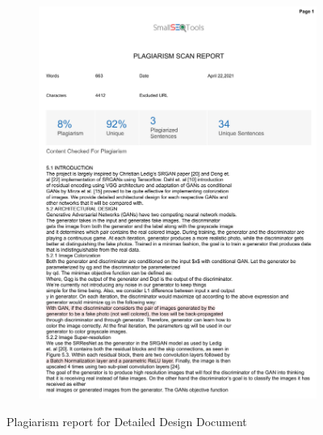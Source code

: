 \documentclass[oneside,a4paper,12pt]{report}
\begin{document}
\begin{appendices}
\begin{figure}
	\begin{subfigure}[H]{\textwidth}
		\centering
    	\includegraphics[scale=0.7, page=1]{plagiarism/detailed_design_documentation.pdf}
    \end{subfigure}
 \caption{Plagiarism report for Detailed Design Document}
    \label{PlagiarismDesign}
\end{figure}
\begin{figure}\ContinuedFloat
    \begin{subfigure}[H]{\textwidth}
    	\centering

\end{subfigure}
\end{figure}
\end{appendices}
\end{document}
